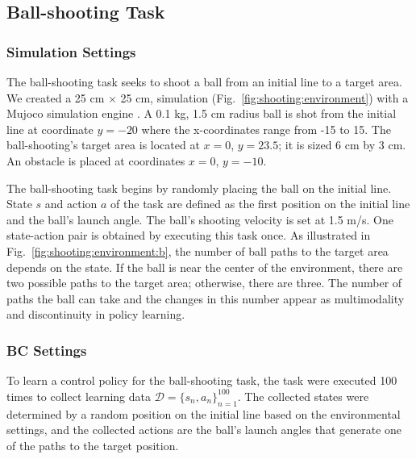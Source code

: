 \documentclass[sn-mathphys-num]{sn-jnl}
\begin{document}
\subsection{Ball-shooting Task}
\subsubsection{Simulation Settings}
The ball-shooting task seeks to shoot a ball from an initial line to a target area.
We created a 25 cm $\times$ 25 cm, simulation (Fig.~\ref{fig:shooting:environment}) with a Mujoco simulation engine \cite{6386109}.
A 0.1 kg, 1.5 cm radius ball is shot from the initial line at coordinate $y=-20$ where the x-coordinates range from -15 to 15.
The ball-shooting's target area is located at $x=0$, $y=23.5$; it is sized 6 cm by 3 cm.
An obstacle is placed at coordinates $x=0$, $y=-10$.

The ball-shooting task begins by randomly placing the ball on the initial line.
State $s$ and action $a$ of the task are defined as the first position on the initial line and the ball's launch angle.
The ball's shooting velocity is set at 1.5 m/s.
One state-action pair is obtained by executing this task once.
As illustrated in Fig.~\ref{fig:shooting:environment:b}, the number of ball paths to the target area depends on the state.
If the ball is near the center of the environment, there are two possible paths to the target area; otherwise, there are three.
The number of paths the ball can take and the changes in this number appear as multimodality and discontinuity in policy learning.



\subsubsection{BC Settings}
To learn a control policy for the ball-shooting task, the task were executed 100 times to collect learning data $\mathcal D = \{s_n, a_n\}_{n=1}^{100}$.
The collected states were determined by a random position on the initial line based on the environmental settings, and the collected actions are the ball's launch angles that generate one of the paths to the target position.
\end{document}
